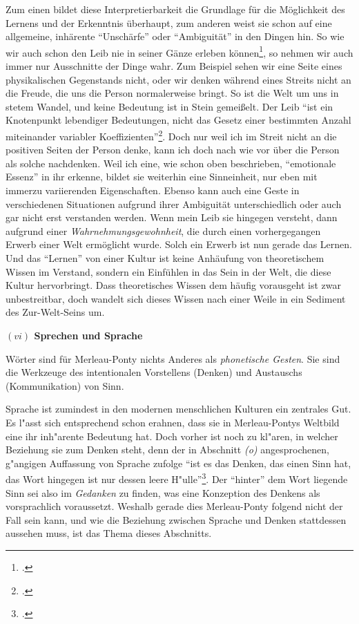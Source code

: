 \documentclass[a4paper, 12pt]{article}
\begin{document}
\begin{onehalfspace}
Zum einen bildet diese Interpretierbarkeit die Grundlage für die Möglichkeit des Lernens und der Erkenntnis überhaupt, zum anderen weist sie schon auf eine allgemeine, inhärente "`Unschärfe"' oder "`Ambiguität"' in den Dingen hin. So wie wir auch schon den Leib nie in seiner Gänze erleben können\footnote{\Cite[Siehe][S. ???]{merleau1966phanomenologie}.}, so nehmen wir auch immer nur Ausschnitte der Dinge wahr. Zum Beispiel sehen wir eine Seite eines physikalischen Gegenstands nicht, oder wir denken während eines Streits nicht an die Freude, die uns die Person normalerweise bringt. So ist die Welt um uns in stetem Wandel, und keine Bedeutung ist in Stein gemeißelt. Der Leib "`ist ein Knotenpunkt lebendiger Bedeutungen, nicht das Gesetz einer bestimmten Anzahl miteinander variabler Koeffizienten"'\footnote{\Cite[Siehe][S. 182]{merleau1966phanomenologie}.}. Doch nur weil ich im Streit nicht an die positiven Seiten der Person denke, kann ich doch nach wie vor über die Person als solche nachdenken. Weil ich eine, wie schon oben beschrieben, "`emotionale Essenz"' in ihr erkenne, bildet sie weiterhin eine Sinneinheit, nur eben mit immerzu variierenden Eigenschaften. Ebenso kann auch eine Geste in verschiedenen Situationen aufgrund ihrer Ambiguität unterschiedlich oder auch gar nicht erst verstanden werden. Wenn mein Leib sie hingegen versteht, dann aufgrund einer \emph{Wahrnehmungsgewohnheit}, die durch einen vorhergegangen Erwerb einer Welt ermöglicht wurde. Solch ein Erwerb ist nun gerade das Lernen. Und das "`Lernen"' von einer Kultur ist keine Anhäufung von theoretischem Wissen im Verstand, sondern ein Einfühlen in das Sein in der Welt, die diese Kultur hervorbringt. Dass theoretisches Wissen dem häufig vorausgeht ist zwar unbestreitbar, doch wandelt sich dieses Wissen nach einer Weile in ein Sediment des Zur-Welt-Seins um. 

\vspace{5mm}

\noindent\textbf{$(vi)$ Sprechen und Sprache}

\noindent Wörter sind für Merleau-Ponty nichts Anderes als \emph{phonetische Gesten}. Sie sind die Werkzeuge des intentionalen Vorstellens (Denken) und Austauschs (Kommunikation) von Sinn. 

Sprache ist zumindest in den modernen menschlichen Kulturen ein zentrales Gut. Es l"asst sich entsprechend schon erahnen, dass sie in Merleau-Pontys Weltbild eine ihr inh"arente Bedeutung hat. Doch vorher ist noch zu kl"aren, in welcher Beziehung sie zum Denken steht, denn der in Abschnitt \emph{(o)} angesprochenen, g"angigen Auffassung von Sprache zufolge "`ist es das Denken, das einen Sinn hat, das Wort hingegen ist nur dessen leere H"ulle"'\footnote{\Cite[Siehe][S. 210]{merleau1966phanomenologie}.}. Der "`hinter"' dem Wort liegende Sinn sei also im \emph{Gedanken} zu finden, was eine Konzeption des Denkens als vorsprachlich voraussetzt. Weshalb gerade dies Merleau-Ponty folgend nicht der Fall sein kann, und wie die Beziehung zwischen Sprache und Denken stattdessen aussehen muss, ist das Thema dieses Abschnitts. 


\end{onehalfspace}
\end{document}
